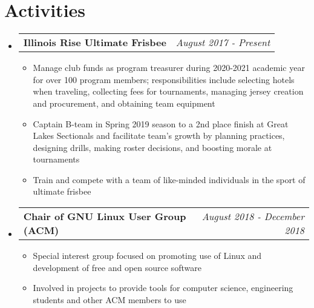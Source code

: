 \documentclass[letterpaper,11pt]{article}
\makeatletter
\newcommand{\resumeBullet}[1]
{\item[$\bullet$]\small
	{#1 \vspace{-1pt}
	}
}
\newcommand{\resumeSubheading}[2]
{\vspace{-1pt}\item[]\small
	\begin{tabular*}{0.97\textwidth}{l@{\extracolsep{\fill}}r}
		\textbf{#1} & \textit{\small #2} \\
	\end{tabular*}\vspace{-6pt}
}
\newcommand{\resumeSubHeadingListStart}{\begin{itemize}[leftmargin=*,itemsep=0.2pt]}
\newcommand{\resumeSubHeadingListEnd}{\end{itemize}\vspace{-4pt}}
\newcommand{\resumeItemListStart}{\begin{itemize}[itemsep=0.2pt]}
\newcommand{\resumeItemListEnd}{\end{itemize}\vspace{-4pt}}
\makeatother
\begin{document}
\section{Activities}
  \resumeSubHeadingListStart
  \resumeSubheading
  {Illinois Rise Ultimate Frisbee}{August 2017 - Present}
  \resumeItemListStart
  	\resumeBullet
  	{Manage club funds as program treasurer during  2020-2021 academic year for over 100 program members; responsibilities include selecting hotels when traveling, collecting fees for
tournaments, managing jersey creation and procurement, and obtaining team equipment}
  	\resumeBullet
  	{Captain B-team in Spring 2019 season to a 2nd place finish at Great Lakes Sectionals and facilitate team's growth by planning practices, designing drills, making roster decisions, and boosting morale at tournaments}
  	\resumeBullet
  	{Train and compete with a team of like-minded individuals in the sport of ultimate frisbee}
  \resumeItemListEnd
  	\resumeSubheading
  	{Chair of GNU Linux User Group (ACM)}{August 2018 - December 2018}
  	\resumeItemListStart
  		\resumeBullet
  		{Special interest group focused on promoting use of Linux and development of free and open source software}
  		\resumeBullet
  		{Involved in projects to provide tools for computer science, engineering students and other ACM members to use}
  	\resumeItemListEnd
  \resumeSubHeadingListEnd
\end{document}
